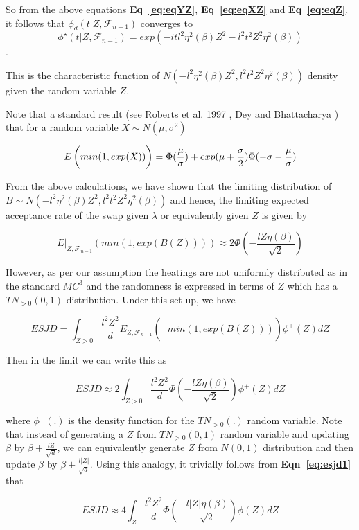 \documentclass[11pt]{article}
\newcommand{\s}{\sigma}
\renewcommand{\b}{\ensuremath{\beta}}
\renewcommand{\l}{\lambda}
\begin{document}
So from the above equations \textbf{Eq~\ref{eq:eqYZ}}, \textbf{Eq~\ref{eq:eqXZ}} and \textbf{Eq~\ref{eq:eqZ}},  it follows that $\phi_{d}(t |Z, \mathcal{F}_{n-1})$ converges to 
$$\phi^{\star}(t|Z,\mathcal{F}_{n-1})= exp(-itl^2 \eta^2(\b) Z^2 - l^2 t^2 Z^2  \eta^2(\b) )$$. 


This is the characteristic function of $ N(-l^2 \eta^2(\b) Z^2, l^2 t^2 Z^2\eta^2(\b) )$ density given the random variable $Z$. 

Note that a standard result (see Roberts et al. 1997 \cite{Roberts1997}, Dey and Bhattacharya \cite{Dey2013}) that for a random variable $X \sim N(\mu, \sigma^2)$ 

\[ E \left ( \vphantom{\frac{1}{2}} min (1, exp(X)) \right) = \Phi(\frac{\mu}{\s}) + exp(\mu + \frac{\s}{2}) \Phi(-\s - \frac{\mu}{\s})    \]


From the above calculations, we have shown that the limiting distribution of $B \sim N(-l^2 \eta^2(\b) Z^2, l^2 t^2 Z^2\eta^2(\b) )$ and hence, the limiting expected acceptance rate of the swap given $\l$ or equivalently given $Z$ is given by 

\[ E|_{Z, \mathcal{F}_{n-1}} \left (min (1, exp(B(Z))) \right )  \approx 2 \Phi(-\frac{lZ \eta(\b)}{\sqrt{2}})  \]

However, as per our assumption the heatings are not uniformly distributed as in the standard $MC^{3}$ and the randomness is expressed in terms of $Z$ which has a $TN_{>0} (0,1)$ distribution. Under this set up, we have 


\[ ESJD = \int_{Z>0} { \frac{l^2 Z^2}{d}  E_{Z,\mathcal{F}_{n-1}} \left ( \phantom{\frac{1}{2}} min \left (1,exp(B(Z)) \right) \right ) \phi^{+}(Z) dZ }  \]

Then in the limit we can write this as 

\begin{equation}\label{eq:esjd1}
ESJD \approx 2 \int_{Z>0}  {\frac{l^2 Z^2}{d} \Phi \left (-\frac{lZ \eta(\b)}{\sqrt{2}} \right ) \phi^{+}(Z) dZ }
\end{equation}

where $\phi^{+} (.)$ is the density function for the $TN_{>0} (.)$ random variable. Note that instead of generating a $Z$ from $TN_{>0}(0,1)$ random variable and updating $\beta$ by $\b + \frac{lZ}{\sqrt{d}}$, we can equivalently generate $Z$ from $N(0,1)$ distribution and then update $\b$ by $\b + \frac{l|Z|}{\sqrt{d}}$. Using this analogy, it trivially follows from \textbf{Eqn~\ref{eq:esjd1}} that

\begin{equation}
ESJD \approx 4 \int_{Z}  {\frac{l^2 Z^2}{d} \Phi \left (-\frac{l|Z| \eta(\b)}{\sqrt{2}} \right ) \phi(Z) dZ }
\end{equation}
\end{document}
